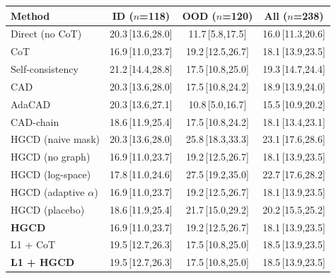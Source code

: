 \begin{tabular}{lccc}
\toprule
Method & ID ($n$=118) & OOD ($n$=120) & All ($n$=238) \\
\midrule
Direct (no CoT) & 20.3\,{\scriptsize[13.6,28.0]} & 11.7\,{\scriptsize[5.8,17.5]} & 16.0\,{\scriptsize[11.3,20.6]} \\
CoT & 16.9\,{\scriptsize[11.0,23.7]} & 19.2\,{\scriptsize[12.5,26.7]} & 18.1\,{\scriptsize[13.9,23.5]} \\
Self-consistency & 21.2\,{\scriptsize[14.4,28.8]} & 17.5\,{\scriptsize[10.8,25.0]} & 19.3\,{\scriptsize[14.7,24.4]} \\
CAD & 20.3\,{\scriptsize[13.6,28.0]} & 17.5\,{\scriptsize[10.8,24.2]} & 18.9\,{\scriptsize[13.9,24.0]} \\
AdaCAD & 20.3\,{\scriptsize[13.6,27.1]} & 10.8\,{\scriptsize[5.0,16.7]} & 15.5\,{\scriptsize[10.9,20.2]} \\
CAD-chain & 18.6\,{\scriptsize[11.9,25.4]} & 17.5\,{\scriptsize[10.8,24.2]} & 18.1\,{\scriptsize[13.4,23.1]} \\
HGCD (naive mask) & 20.3\,{\scriptsize[13.6,28.0]} & 25.8\,{\scriptsize[18.3,33.3]} & 23.1\,{\scriptsize[17.6,28.6]} \\
HGCD (no graph) & 16.9\,{\scriptsize[11.0,23.7]} & 19.2\,{\scriptsize[12.5,26.7]} & 18.1\,{\scriptsize[13.9,23.5]} \\
HGCD (log-space) & 17.8\,{\scriptsize[11.0,24.6]} & 27.5\,{\scriptsize[19.2,35.0]} & 22.7\,{\scriptsize[17.6,28.2]} \\
HGCD (adaptive $\alpha$) & 16.9\,{\scriptsize[11.0,23.7]} & 19.2\,{\scriptsize[12.5,26.7]} & 18.1\,{\scriptsize[13.9,23.5]} \\
HGCD (placebo) & 18.6\,{\scriptsize[11.9,25.4]} & 21.7\,{\scriptsize[15.0,29.2]} & 20.2\,{\scriptsize[15.5,25.2]} \\
\textbf{HGCD} & 16.9\,{\scriptsize[11.0,23.7]} & 19.2\,{\scriptsize[12.5,26.7]} & 18.1\,{\scriptsize[13.9,23.5]} \\
L1 + CoT & 19.5\,{\scriptsize[12.7,26.3]} & 17.5\,{\scriptsize[10.8,25.0]} & 18.5\,{\scriptsize[13.9,23.5]} \\
\textbf{L1 + HGCD} & 19.5\,{\scriptsize[12.7,26.3]} & 17.5\,{\scriptsize[10.8,25.0]} & 18.5\,{\scriptsize[13.9,23.5]} \\
\bottomrule
\end{tabular}
